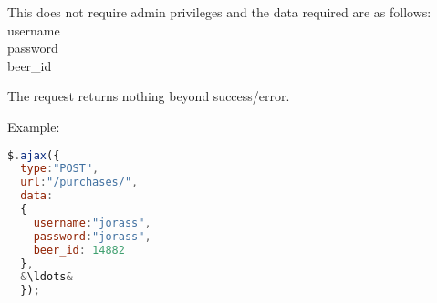 \documentclass[a4paper]{article}
\begin{document}
\begin{description}
  This does not require admin privileges and the data required are as follows:\hfill\\
  username\hfill\\
  password\hfill\\
  beer\_id

  The request returns nothing beyond success/error.

  Example:\hfill\\
  \begin{lstlisting}[language=javascript, frame=single, showstringspaces = false, basicstyle=\small\ttfamily, escapechar=\&]
$.ajax({
  type:"POST",
  url:"/purchases/",
  data:
  {
    username:"jorass",
    password:"jorass",
    beer_id: 14882
  },
  &\ldots&
  });
  \end{lstlisting}
\end{description}
\end{document}
